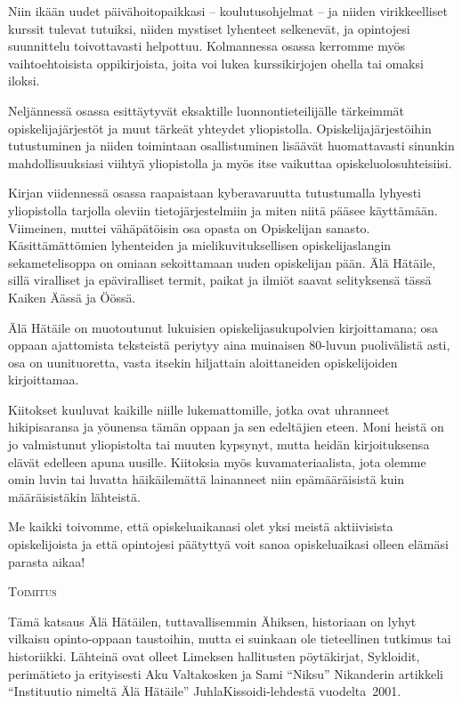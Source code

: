 \documentclass[a5paper, 8pt, twocolumn]{book} %
\numberwithin{equation}{section}
\begin{document}
Niin ikään uudet päivähoitopaikkasi -- koulutus\-ohjelmat -- ja niiden virikkeelliset kurssit tulevat tutuiksi, niiden mystiset lyhenteet selkenevät, ja opintojesi suunnittelu toivottavasti helpottuu. Kolmannessa osassa kerromme myös vaihtoehtoisista oppikirjoista, joita voi lukea kurssikirjojen ohella tai omaksi iloksi. 

Neljännessä osassa esittäytyvät eksaktille luonnontieteilijälle tärkeimmät opiskelijajärjestöt ja muut tärkeät yhteydet yliopistolla. Opiskelijajärjestöihin tutustuminen ja niiden toimintaan osallistuminen lisäävät huomattavasti
sinunkin mahdollisuuksiasi viihtyä
yliopistolla ja myös itse vaikuttaa opiskeluolosuhteisiisi.

Kirjan viidennessä osassa raapaistaan
kyberavaruutta tutustumalla lyhyesti
yliopistolla tarjolla oleviin tieto\-järjestelmiin
ja miten niitä pääsee käyttämään.
Viimeinen, muttei vähäpätöisin osa opasta
on Opiskelijan sanasto. Käsittämättömien
lyhenteiden ja mielikuvituksellisen opiskelijaslangin
sekametelisoppa on omiaan sekoittamaan
uuden opiskelijan pään. Älä Hätäile,
sillä viralliset ja epäviralliset termit, paikat ja
ilmiöt saavat selityksensä tässä Kaiken Äässä
ja Öössä.

Älä Hätäile on muotoutunut lukuisien
opiskelijasukupolvien kirjoittamana; osa
oppaan ajattomista teksteistä periytyy aina
muinaisen 80-luvun puolivälistä asti, osa on
uunituoretta, vasta itsekin hiljattain aloittaneiden
opiskelijoiden kirjoittamaa. 

Kiitokset
kuuluvat kaikille niille lukemattomille, jotka
ovat uhranneet hikipisaransa ja yöunensa
tämän oppaan ja sen edeltäjien eteen. Moni
heistä on jo valmistunut yliopistolta tai muuten
kypsynyt, mutta heidän kirjoituksensa
elävät edelleen apuna uusille. Kiitoksia myös
kuvamateriaalista, jota olemme omin luvin
tai luvatta häikäilemättä lainanneet niin epämääräisistä
kuin määräisistäkin lähteistä.

Me kaikki toivomme, että opiskeluaikanasi
olet yksi meistä aktiivisista opiskelijoista
ja että opintojesi päätyttyä voit sanoa
opiskeluaikasi olleen elämäsi parasta aikaa!

\vspace{0.5cm}
\noindent\textsc{Toimitus}

Tämä katsaus Älä Hätäilen, tuttavallisemmin
Ähiksen, historiaan on lyhyt vilkaisu
opinto-oppaan taustoihin, mutta ei
suinkaan ole tieteellinen tutkimus tai historiikki.
Lähteinä ovat olleet Limeksen hallitusten
pöytäkirjat, Sykloidit, perimätieto ja
erityisesti Aku Valtakosken ja Sami ``Niksu''
Nikanderin artikkeli ``Instituutio nimeltä
Älä Hätäile'' JuhlaKissoidi-lehdestä
vuodelta~2001.
\end{document}
